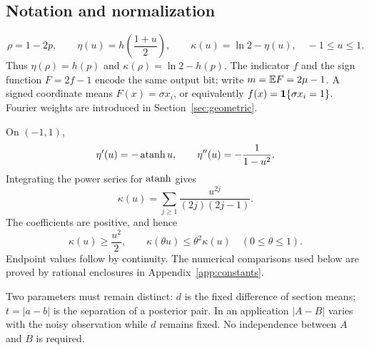 \subsection{Notation and normalization}
\begin{equation}\label{eq:eta}
\rho=1-2p,\qquad
\eta(u)=h\!\left(\frac{1+u}{2}\right),\qquad
\kappa(u)=\ln2-\eta(u),\quad -1\le u\le1.
\end{equation}
Thus $\eta(\rho)=h(p)$ and $\kappa(\rho)=\ln2-h(p)$. The indicator $f$ and the sign function $F=2f-1$ encode the same output bit; write $m=\mathbb E F=2\mu-1$. A signed coordinate means $F(x)=\sigma x_i$, or equivalently $f(x)=\mathbf 1\{\sigma x_i=1\}$. Fourier weights are introduced in Section~\ref{sec:geometric}.

On $(-1,1)$,
\[
 \eta'(u)=-\operatorname{atanh} u,\qquad \eta''(u)=-\frac1{1-u^2}.
\]
Integrating the power series for $\operatorname{atanh}$ gives
\begin{equation}\label{eq:series}
\kappa(u)=\sum_{j\ge1}\frac{u^{2j}}{(2j)(2j-1)}.
\end{equation}
The coefficients are positive, and hence
\begin{equation}\label{eq:entropyfacts}
\kappa(u)\ge\frac{u^2}{2},\qquad
\kappa(\theta u)\le\theta^2\kappa(u)\quad(0\le\theta\le1).
\end{equation}
Endpoint values follow by continuity. The numerical comparisons used below are proved by rational enclosures in Appendix~\ref{app:constants}.

Two parameters must remain distinct: $d$ is the fixed difference of section means; $t=|a-b|$ is the separation of a posterior pair. In an application $|A-B|$ varies with the noisy observation while $d$ remains fixed. No independence between $A$ and $B$ is required.
